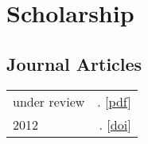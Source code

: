 \documentclass[11pt,letterpaper,twoside]{article}
\makeatletter
\newcommand{\myvrule}{\color{lightgray}\vrule width 1.0pt}
\newenvironment{cvsection}{%
  \renewcommand{\arraystretch}{1.75}
  \begin{longtable}[l]{@{} L R @{}}
}{%
  \end{longtable}
}
\makeatother
\begin{document}




\section*{Scholarship}

\subsection*{Journal Articles}

\begin{cvsection}
  under review & \null{}.
  [\href{http://brianbuccola.com/files/buccola.spector2015maximality.pdf}{pdf}] \\

  2012 & \null{}.
  [\href{http://dx.doi.org/10.3765/sp}{doi}] \\
\end{cvsection}



\end{document}

